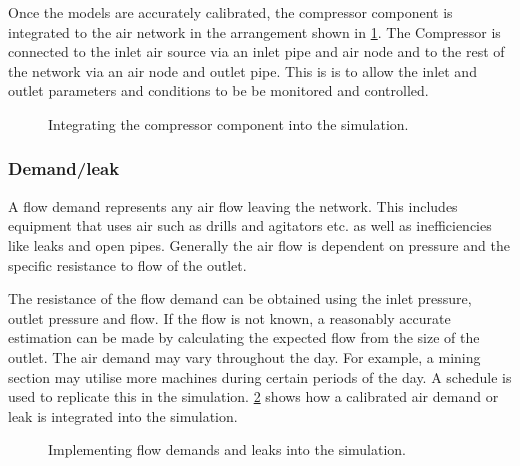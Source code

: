 		\par
		Once the models are accurately calibrated, the compressor component is integrated to the air network in the arrangement shown in \cref{fig: Compressor models}. The Compressor is connected to the inlet air source via an inlet pipe and air node and to the rest of the network via an air node and outlet pipe. This is is to allow the inlet and outlet parameters and conditions to be be monitored and controlled.
		\begin{figure}[h]
			\centering
			\caption{Integrating the compressor component into the simulation.}
			\label{fig: Compressor models}
		\end{figure}		

		\subsubsection{Demand/leak}
			A flow demand represents any air flow leaving the network. This includes equipment that uses air such as drills and agitators etc. as well as inefficiencies like leaks and open pipes. Generally the air flow is dependent on pressure and the specific resistance to flow of the outlet. 
			\par 
			The resistance of the flow demand can be obtained using the inlet pressure, outlet pressure and flow. If the flow is not known, a reasonably accurate estimation can be made by calculating the expected flow from the size of the outlet. The air demand may vary throughout the day. For example, a mining section may utilise more machines during certain periods of the day. A schedule is used to replicate this in the simulation. \cref{fig: Demand component} shows how a calibrated air demand or leak is integrated into the simulation.
			
			\begin{figure}[h]
				\centering
				\caption{Implementing flow demands and leaks into the simulation.} 
				\label{fig: Demand component}
			\end{figure}
